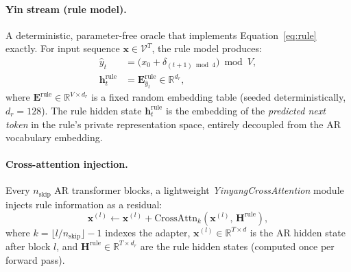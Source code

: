 \documentclass[10pt,twocolumn]{article}
\begin{document}
\paragraph{Yin stream (rule model).}
A deterministic, parameter-free oracle that implements Equation~\eqref{eq:rule} exactly. For input sequence $\mathbf{x} \in \mathcal{V}^T$, the rule model produces:
\begin{align}
  \hat{y}_t &= \bigl(x_0 + \delta_{(t+1) \bmod 4}\bigr) \bmod V, \label{eq:rule_pred}\\
  \mathbf{h}^{\text{rule}}_t &= \mathbf{E}^{\text{rule}}_{\hat{y}_t} \in \mathbb{R}^{d_r}, \label{eq:rule_hidden}
\end{align}
where $\mathbf{E}^{\text{rule}} \in \mathbb{R}^{V \times d_r}$ is a fixed random embedding table (seeded deterministically, $d_r = 128$). The rule hidden state $\mathbf{h}^{\text{rule}}_t$ is the embedding of the \emph{predicted next token} in the rule's private representation space, entirely decoupled from the AR vocabulary embedding.

\paragraph{Cross-attention injection.}
Every $n_\text{skip}$ AR transformer blocks, a lightweight \emph{YinyangCrossAttention} module injects rule information as a residual:
\begin{equation}
  \mathbf{x}^{(l)} \leftarrow \mathbf{x}^{(l)} + \text{CrossAttn}_k\!\left(\mathbf{x}^{(l)},\, \mathbf{H}^{\text{rule}}\right),
  \label{eq:inject}
\end{equation}
where $k = \lfloor l / n_\text{skip} \rfloor - 1$ indexes the adapter, $\mathbf{x}^{(l)} \in \mathbb{R}^{T \times d}$ is the AR hidden state after block $l$, and $\mathbf{H}^{\text{rule}} \in \mathbb{R}^{T \times d_r}$ are the rule hidden states (computed once per forward pass).
\end{document}
